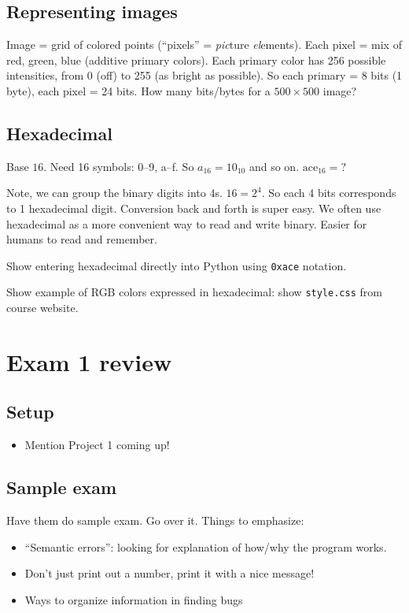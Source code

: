 \documentclass{article}
\begin{document}
\subsection*{Representing images}

Image = grid of colored points (``pixels'' = \emph{pic}ture
\emph{el}ements).  Each pixel = mix of red, green, blue (additive
primary colors).  Each primary color has 256 possible intensities,
from 0 (off) to 255 (as bright as possible).  So each primary = 8 bits
(1 byte), each pixel = 24 bits.  How many bits/bytes for a $500 \times
500$ image?

\subsection*{Hexadecimal}

Base $16$.  Need 16 symbols: 0--9, a--f. So $a_{16} = 10_{10}$ and so
on. $\mbox{ace}_{16} = ?$

Note, we can group the binary digits into 4s.  $16 = 2^4$.  So each 4
bits corresponds to 1 hexadecimal digit.  Conversion back and forth is
super easy.  We often use hexadecimal as a more convenient way to read
and write binary.  Easier for humans to read and remember.

Show entering hexadecimal directly into Python using \verb|0xace|
notation.

Show example of RGB colors expressed in hexadecimal: show
\verb|style.css| from course website.

\section{Exam 1 review}

\subsection*{Setup}

\begin{itemize}
\item Mention Project 1 coming up!
\end{itemize}

\subsection*{Sample exam}

Have them do sample exam. Go over it.  Things to emphasize:
\begin{itemize}
\item ``Semantic errors'': looking for explanation of how/why the
  program works.
\item Don't just print out a number, print it with a nice message!
\item Ways to organize information in finding bugs
\end{itemize}
\end{document}
